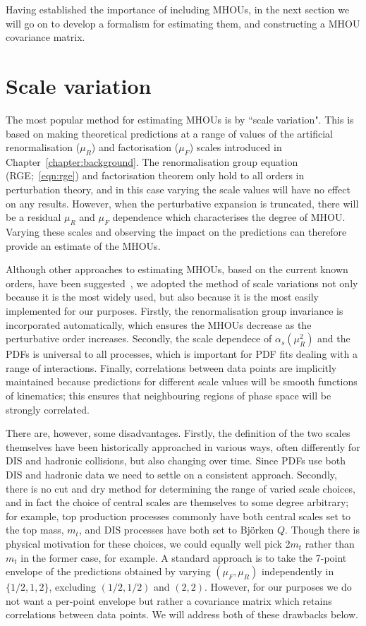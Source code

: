 Having established the importance of including MHOUs, in the next section we will go on to develop a formalism for estimating them, and constructing a MHOU covariance matrix.

\section{Scale variation}
\label{sec:svn}

The most popular method for estimating MHOUs is by ``scale variation". This is based on making theoretical predictions at a range of values of the artificial renormalisation ($\mu_R$) and factorisation ($\mu_F$) scales introduced in Chapter~\ref{chapter:background}. The renormalisation group equation (RGE;~\ref{eqn:rge}) and factorisation theorem only hold to all orders in perturbation theory, and in this case varying the scale values will have no effect on any results. However, when the perturbative expansion is truncated, there will be a residual $\mu_R$ and $\mu_F$ dependence which characterises the degree of MHOU. Varying these scales and observing the impact on the predictions can therefore provide an estimate of the MHOUs. 

Although other approaches to estimating MHOUs, based on the current known orders, have been suggested~\cite{Cacciari:2011ze, David:2013gaa, Bagnaschi:2014wea}, we adopted the method of scale variations not only because it is the most widely used, but also because it is the most easily implemented for our purposes. Firstly, the renormalisation group invariance is incorporated automatically, which ensures the MHOUs decrease as the perturbative order increases. Secondly, the scale dependece of $\alpha_s(\mu_R^2)$ and the PDFs is universal to all processes, which is important for PDF fits dealing with a range of interactions. Finally, correlations between data points are implicitly maintained because predictions for different scale values will be smooth functions of kinematics; this ensures that neighbouring regions of phase space will be strongly correlated.

There are, however, some disadvantages. Firstly, the definition of the two scales themselves have been historically approached in various ways, often differently for DIS and hadronic collisions, but also changing over time. Since PDFs use both DIS and hadronic data we need to settle on a consistent approach. Secondly, there is no cut and dry method for determining the range of varied scale choices, and in fact the choice of central scales are themselves to some degree arbitrary; for example, top production processes commonly have both central scales set to the top mass, $m_t$, and DIS processes have both set to Bj\"orken $Q$. Though there is physical motivation for these choices, we could equally well pick 2$m_t$ rather than $m_t$ in the former case, for example. A standard approach is to take the 7-point envelope of the predictions obtained by varying $(\mu_F, \mu_R)$ independently in $\{1/2, 1, 2\}$, excluding $(1/2, 1/2)$ and $(2,2)$. However, for our purposes we do not want a per-point envelope but rather a covariance matrix which retains correlations between data points. We will address both of these drawbacks below. 

